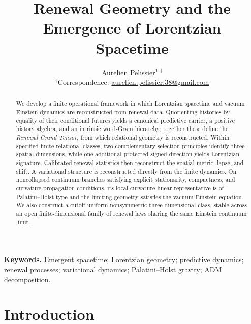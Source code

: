 \documentclass[11pt]{article}
\title{\textbf{Renewal Geometry and the Emergence of Lorentzian Spacetime}}
\author{Aurelien Pelissier$^{1,\dagger}$\\
{\small $^{\dagger}$Correspondence: \href{mailto:aurelien.pelissier.38@gmail.com}{aurelien.pelissier.38@gmail.com}}}
\date{}
\numberwithin{equation}{section}
\theoremstyle{definition}
\theoremstyle{remark}
\begin{document}
\maketitle

\begin{abstract}
We develop a finite operational framework in which Lorentzian spacetime and vacuum Einstein dynamics are reconstructed from renewal data. Quotienting histories by equality of their conditional futures yields a canonical predictive carrier, a positive history algebra, and an intrinsic word-Gram hierarchy; together these define the \emph{Renewal Grand Tensor}, from which relational geometry is reconstructed. Within specified finite relational classes, two complementary selection principles identify three spatial dimensions, while one additional protected signed direction yields Lorentzian signature. Calibrated renewal statistics then reconstruct the spatial metric, lapse, and shift.
%
A variational structure is reconstructed directly from the finite dynamics. On noncollapsed continuum branches satisfying explicit stationarity, compactness, and curvature-propagation conditions, its local curvature-linear representative is of Palatini--Holst type and the limiting geometry satisfies the vacuum Einstein equation. We also construct a cutoff-uniform nonsymmetric three-dimensional class, stable across an open finite-dimensional family of renewal laws sharing the same Einstein continuum limit.
\end{abstract}


\medskip
\noindent\textbf{Keywords.} Emergent spacetime; Lorentzian geometry; predictive dynamics; renewal processes; variational dynamics; Palatini--Holst gravity; ADM decomposition.
\setcounter{tocdepth}{1}
\begingroup
\tableofcontents
\endgroup
\clearpage



\section{Introduction}
\label{sec:introduction}
\end{document}
